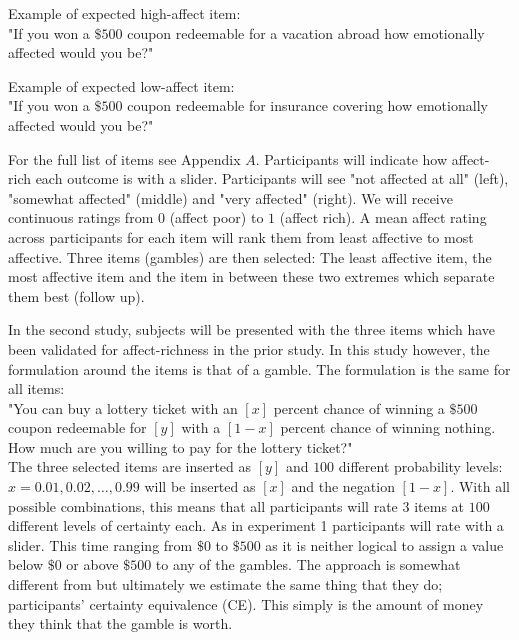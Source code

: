 \documentclass[12pt]{article}
\begin{document}
\vspace{3mm}

Example of expected high-affect item:\\
"If you won a $\$500$ coupon redeemable
for a vacation abroad how emotionally
affected would you be?"

\vspace{3mm}

Example of expected low-affect item: \\
"If you won a $\$500$ coupon redeemable
for insurance covering how emotionally
affected would you be?"

\vspace{3mm}

For the full list of items see Appendix $A$.
Participants
will indicate how affect-rich
each outcome is with a slider. Participants will
see "not affected at all" (left),
"somewhat affected" (middle)
and "very affected" (right).
We will receive continuous ratings from $0$
(affect poor) to $1$ (affect rich). A mean
affect rating across participants for each
item will rank them from least affective to
most affective. Three items (gambles) are
then selected: The least affective item,
the most affective item and the item in
between these two extremes which separate them
best (follow up).

\vspace{3mm}

In the second study, subjects will be presented
with the three items which have been validated
for affect-richness in the prior study.
In this study however, the formulation
around the items is that of a gamble.
The formulation is the same
for all items: \\

"You can buy a lottery ticket with an $[x]$
percent chance of winning a $\$500$ coupon
redeemable for $[y]$ with a $[1-x]$ percent
chance of winning nothing. How much are you
willing to pay for the lottery ticket?" \\

The three selected items are inserted as $[y]$
and $100$ different probability levels:
$x = 0.01, 0.02, \ldots, 0.99$ will be
inserted as $[x]$ and the negation $[1-x]$.
With all
possible combinations, this means that
all participants will rate $3$ items
at $100$ different levels of certainty each.
As in experiment 1 participants will rate
with a slider. This time ranging from
$\$0$ to $\$500$ as it is neither logical
to assign a value below $\$0$ or above
$\$500$ to any of the gambles.
The approach is somewhat
different from \textcite{gonzalez1999shape}
but ultimately we estimate the same thing that
they do; participants' certainty equivalence (CE).
This simply is the amount of money they think
that the gamble is worth. \\
\end{document}
